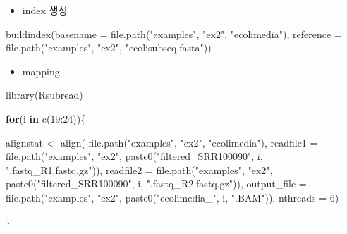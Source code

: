 \documentclass[
]{book}
\newenvironment{Shaded}{\begin{snugshade}}{\end{snugshade}}
\newcommand{\AttributeTok}[1]{\textcolor[rgb]{0.77,0.63,0.00}{#1}}
\newcommand{\ControlFlowTok}[1]{\textcolor[rgb]{0.13,0.29,0.53}{\textbf{#1}}}
\newcommand{\DecValTok}[1]{\textcolor[rgb]{0.00,0.00,0.81}{#1}}
\newcommand{\FunctionTok}[1]{\textcolor[rgb]{0.00,0.00,0.00}{#1}}
\newcommand{\NormalTok}[1]{#1}
\newcommand{\OtherTok}[1]{\textcolor[rgb]{0.56,0.35,0.01}{#1}}
\newcommand{\SpecialCharTok}[1]{\textcolor[rgb]{0.00,0.00,0.00}{#1}}
\newcommand{\StringTok}[1]{\textcolor[rgb]{0.31,0.60,0.02}{#1}}
\providecommand{\tightlist}{%
  \setlength{\itemsep}{0pt}\setlength{\parskip}{0pt}}
\begin{document}
\begin{itemize}
\tightlist
\item
  index 생성
\end{itemize}

\begin{Shaded}
\begin{Highlighting}[]

\FunctionTok{buildindex}\NormalTok{(}\AttributeTok{basename =} \FunctionTok{file.path}\NormalTok{(}\StringTok{"examples"}\NormalTok{, }\StringTok{"ex2"}\NormalTok{, }\StringTok{"ecolimedia"}\NormalTok{), }
           \AttributeTok{reference =} \FunctionTok{file.path}\NormalTok{(}\StringTok{"examples"}\NormalTok{, }\StringTok{"ex2"}\NormalTok{, }\StringTok{"ecolisubseq.fasta"}\NormalTok{))}
\end{Highlighting}
\end{Shaded}

\begin{itemize}
\tightlist
\item
  mapping
\end{itemize}

\begin{Shaded}
\begin{Highlighting}[]
\FunctionTok{library}\NormalTok{(Rsubread)}


\ControlFlowTok{for}\NormalTok{(i }\ControlFlowTok{in} \FunctionTok{c}\NormalTok{(}\DecValTok{19}\SpecialCharTok{:}\DecValTok{24}\NormalTok{))\{}
  
\NormalTok{  alignstat }\OtherTok{\textless{}{-}} \FunctionTok{align}\NormalTok{(}
    \FunctionTok{file.path}\NormalTok{(}\StringTok{"examples"}\NormalTok{, }\StringTok{"ex2"}\NormalTok{, }\StringTok{"ecolimedia"}\NormalTok{),}
    \AttributeTok{readfile1 =} \FunctionTok{file.path}\NormalTok{(}\StringTok{"examples"}\NormalTok{, }\StringTok{"ex2"}\NormalTok{, }\FunctionTok{paste0}\NormalTok{(}\StringTok{"filtered\_SRR100090"}\NormalTok{, i, }\StringTok{".fastq\_R1.fastq.gz"}\NormalTok{)),}
    \AttributeTok{readfile2 =} \FunctionTok{file.path}\NormalTok{(}\StringTok{"examples"}\NormalTok{, }\StringTok{"ex2"}\NormalTok{, }\FunctionTok{paste0}\NormalTok{(}\StringTok{"filtered\_SRR100090"}\NormalTok{, i, }\StringTok{".fastq\_R2.fastq.gz"}\NormalTok{)),}
    \AttributeTok{output\_file =} \FunctionTok{file.path}\NormalTok{(}\StringTok{"examples"}\NormalTok{, }\StringTok{"ex2"}\NormalTok{, }\FunctionTok{paste0}\NormalTok{(}\StringTok{"ecolimedia\_"}\NormalTok{, i, }\StringTok{".BAM"}\NormalTok{)),}
    \AttributeTok{nthreads =} \DecValTok{6}\NormalTok{)}

\NormalTok{\}}
\end{Highlighting}
\end{Shaded}
\end{document}
